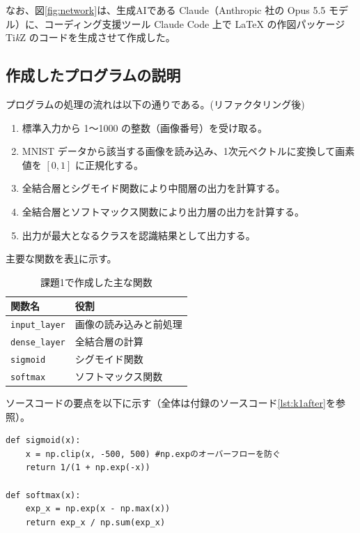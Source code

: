 \documentclass[a4paper,11pt]{ltjsarticle}
\begin{document}
なお、図\ref{fig:network}は、生成AIである Claude（Anthropic 社の Opus 5.5 モデル）に、コーディング支援ツール Claude Code 上で LaTeX の作図パッケージ Ti\emph{k}Z のコードを生成させて作成した。

\subsection{作成したプログラムの説明}

プログラムの処理の流れは以下の通りである。(リファクタリング後)
\begin{enumerate}
  \item 標準入力から 1～1000 の整数（画像番号）を受け取る。
  \item MNIST データから該当する画像を読み込み、1次元ベクトルに変換して画素値を $[0, 1]$ に正規化する。
  \item 全結合層とシグモイド関数により中間層の出力を計算する。
  \item 全結合層とソフトマックス関数により出力層の出力を計算する。
  \item 出力が最大となるクラスを認識結果として出力する。
\end{enumerate}

主要な関数を表\ref{tab:func1}に示す。
\begin{table}[H]
  \centering
  \caption{課題1で作成した主な関数}
  \label{tab:func1}
  \begin{tabular}{ll}
    \toprule
    関数名 & 役割 \\
    \midrule
    \texttt{input\_layer} & 画像の読み込みと前処理 \\
    \texttt{dense\_layer} & 全結合層の計算 \\
    \texttt{sigmoid}      & シグモイド関数 \\
    \texttt{softmax}      & ソフトマックス関数 \\
    \bottomrule
  \end{tabular}
\end{table}

ソースコードの要点を以下に示す（全体は付録のソースコード\ref{lst:k1after}を参照）。

\begin{lstlisting}[caption={シグモイド関数・ソフトマックス関数}, label=lst:act1]
def sigmoid(x):
    x = np.clip(x, -500, 500) #np.expのオーバーフローを防ぐ
    return 1/(1 + np.exp(-x))

def softmax(x):
    exp_x = np.exp(x - np.max(x))
    return exp_x / np.sum(exp_x)
\end{lstlisting}
\end{document}
